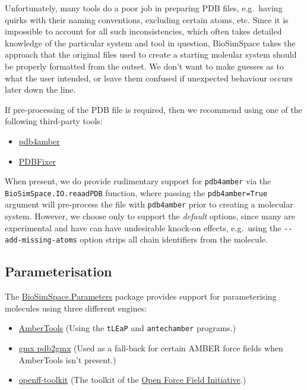 Unfortunately, many tools do a poor job in preparing PDB files,
e.g.~having quirks with their naming conventions, excluding certain
atoms, etc. Since it is impossible to account for all such
inconsistencies, which often takes detailed knowledge of the particular
system and tool in question, BioSimSpace takes the approach that the
original files used to create a starting moleular system should be
properly formatted from the outset. We don't want to make guesses as to
what the user intended, or leave them confused if unexpected behaviour
occurs later down the line.

If pre-processing of the PDB file is required, then we recommend using
one of the following third-party tools:

\begin{itemize}
\tightlist
\item
  \href{https://github.com/Amber-MD/pdb4amber}{pdb4amber}
\item
  \href{https://htmlpreview.github.io/?https://github.com/openmm/pdbfixer/blob/master/Manual.html}{PDBFixer}
\end{itemize}

When present, we do provide rudimentary support for \texttt{pdb4amber}
via the \texttt{BioSimSpace.IO.reaadPDB} function, where passing the
\texttt{pdb4amber=True} argument will pre-process the file with
\texttt{pdb4amber} prior to creating a molecular system. However, we
choose only to support the \emph{default} options, since many are
experimental and have can have undesirable knock-on effects, e.g.~using
the \texttt{-\/-add-missing-atoms} option strips all chain identifiers
from the molecule.

\hypertarget{parameterisation}{%
\subsection{Parameterisation}\label{parameterisation}}

The
\href{https://biosimspace.org/api/index_Parameters.html}{BioSimSpace.Parameters}
package provides support for parameterising molecules using three
different engines:

\begin{itemize}
\tightlist
\item
  \href{https://ambermd.org/AmberTools.php}{AmberTools} (Using the
  \texttt{tLEaP} and \texttt{antechamber} programs.)
\item
  \href{https://manual.gromacs.org/documentation/current/onlinehelp/gmx-pdb2gmx.html}{gmx
  pdb2gmx} (Used as a fall-back for certain AMBER force fields when
  AmberTools isn't present.)
\item
  \href{https://github.com/openforcefield/openff-toolkit}{openff-toolkit}
  (The toolkit of the \href{https://openforcefield.org/}{Open Force
  Field Initiative}.)
\end{itemize}


